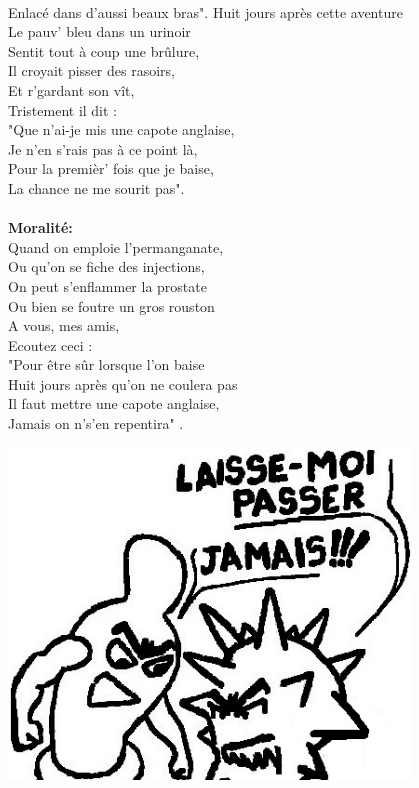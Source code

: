 \\Enlacé dans d'aussi beaux bras".
\breakpage
Huit jours après cette aventure
\\Le pauv' bleu dans un urinoir
\\Sentit tout à coup une brûlure,
\\Il croyait pisser des rasoirs,
\\Et r'gardant son vît,
\\Tristement il dit :
\\"Que n'ai-je mis une capote anglaise,
\\Je n'en s'rais pas à ce point là,
\\Pour la premièr' fois que je baise,
\\La chance ne me sourit pas".
\\\\\textbf{Moralité:}
\\Quand on emploie l'permanganate,
\\Ou qu'on se fiche des injections,
\\On peut s'enflammer la prostate
\\Ou bien se foutre un gros rouston
\\A vous, mes amis,
\\Ecoutez ceci :
\\"Pour être sûr lorsque l'on baise
\\Huit jours après qu'on ne coulera pas
\\Il faut mettre une capote anglaise,
\\Jamais on n's'en repentira" .
\begin{center}
   \includegraphics[width=0.8\textwidth]{images/capote_anglaise.jpg}
 \end{center}

\breakpage
